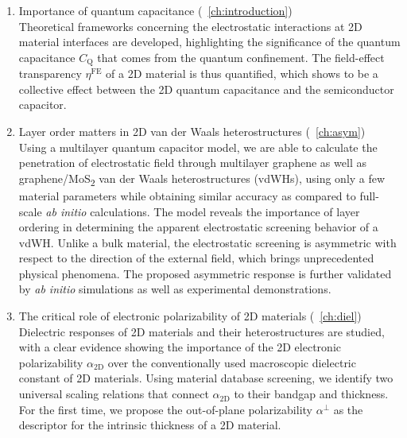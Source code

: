 \begin{enumerate}
\item Importance of quantum capacitance (~\autoref{ch:introduction})\\
  
  Theoretical frameworks concerning the electrostatic interactions at
  2D material interfaces are developed, highlighting the significance
  of the quantum capacitance $C_{\mathrm{Q}}$ that comes from the
  quantum confinement. The field-effect transparency
  $\eta^{\mathrm{FE}}$ of a 2D material is thus quantified, which
  shows to be a collective effect between the 2D quantum capacitance
  and the semiconductor capacitor.

  
\item Layer order matters in 2D van der Waals heterostructures (~\autoref{ch:asym})\\
  Using a multilayer quantum capacitor model, we are able to calculate
  the penetration of electrostatic field through multilayer graphene
  as well as graphene/MoS\textsubscript{2} van der Waals
  heterostructures (vdWHs), using only a few material parameters while
  obtaining similar accuracy as compared to full-scale \textit{ab
    initio} calculations. The model reveals the importance of layer
  ordering in determining the apparent electrostatic screening
  behavior of a vdWH. Unlike a bulk material, the electrostatic
  screening is asymmetric with respect to the direction of the
  external field, which brings unprecedented physical phenomena. The
  proposed asymmetric response is further validated by \textit{ab
    initio} simulations as well as experimental demonstrations.
  
\item The critical role of electronic polarizability of 2D materials
  (~\autoref{ch:diel})\\
  Dielectric responses of 2D materials and their heterostructures are
  studied, with a clear evidence showing the importance of the 2D
  electronic polarizability $\alpha_{\mathrm{2D}}$ over the
  conventionally used macroscopic dielectric constant of 2D
  materials. Using material database screening, we identify two
  universal scaling relations that connect $\alpha_{\mathrm{2D}}$ to
  their bandgap and thickness. For the first time, we propose the
  out-of-plane polarizability $\alpha^{\perp}$ as the descriptor for
  the intrinsic thickness of a 2D material.


\end{enumerate}
